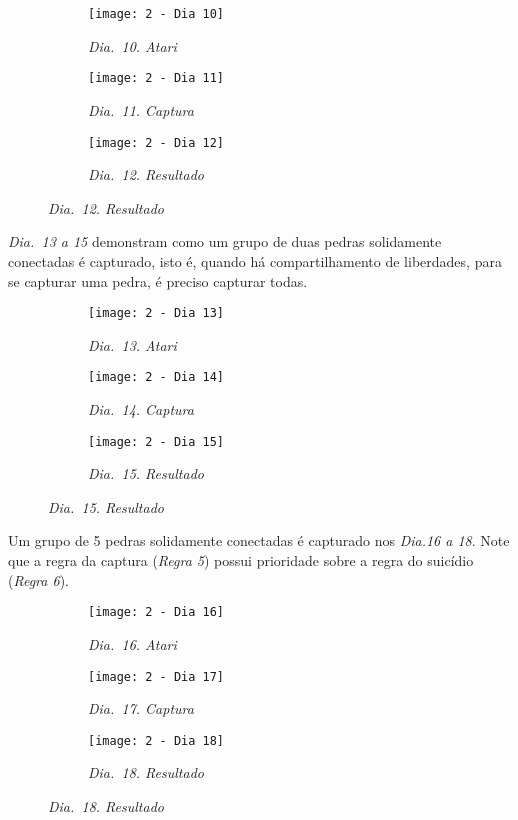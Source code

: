 \begin{figure}[h]
    \centering
    \begin{subfigure}{.3\textwidth}
        \centering
        \texttt{[image: 2 - Dia 10]}
        \caption*{\emph{Dia.\@~10. Atari}}
    \end{subfigure}
    \begin{subfigure}{.3\textwidth}
        \centering
        \texttt{[image: 2 - Dia 11]}
        \caption*{\emph{Dia.\@~11. Captura}}
    \end{subfigure}
    \begin{subfigure}{.3\textwidth}
        \centering
        \texttt{[image: 2 - Dia 12]}
        \caption*{\emph{Dia.\@~12. Resultado}}
    \end{subfigure}
\end{figure}

\pagebreak

\emph{Dia.\@~13 a 15} demonstram  como um grupo de duas pedras solidamente conectadas é capturado, isto é, quando há compartilhamento de liberdades, para se capturar uma pedra, é preciso capturar todas.

\begin{figure}[h]
    \centering
    \begin{subfigure}{.3\textwidth}
        \centering
        \texttt{[image: 2 - Dia 13]}
        \caption*{\emph{Dia.\@~13. Atari}}
    \end{subfigure}
    \begin{subfigure}{.3\textwidth}
        \centering
        \texttt{[image: 2 - Dia 14]}
        \caption*{\emph{Dia.\@~14. Captura}}
    \end{subfigure}
    \begin{subfigure}{.3\textwidth}
        \centering
        \texttt{[image: 2 - Dia 15]}
        \caption*{\emph{Dia.\@~15. Resultado}}
    \end{subfigure}
\end{figure}

Um grupo de 5 pedras solidamente conectadas é capturado nos \emph{Dia.\@ 16 a 18}. Note que a regra da captura (\emph{Regra 5}) possui prioridade sobre a regra do suicídio (\emph{Regra 6}).

\begin{figure}[h!]
    \centering
    \begin{subfigure}{.3\textwidth}
        \centering
        \texttt{[image: 2 - Dia 16]}
        \caption*{\emph{Dia.\@~16. Atari}}
    \end{subfigure}
    \begin{subfigure}{.3\textwidth}
        \centering
        \texttt{[image: 2 - Dia 17]}
        \caption*{\emph{Dia.\@~17. Captura}}
    \end{subfigure}
    \begin{subfigure}{.3\textwidth}
        \centering
        \texttt{[image: 2 - Dia 18]}
        \caption*{\emph{Dia.\@~18. Resultado}}
    \end{subfigure}
\end{figure}

